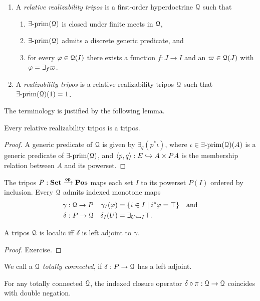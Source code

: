 \begin{definition} $ $
\begin{enumerate}
\item 
A \emph{relative realizability tripos} is a first-order hyperdoctrine ${\EuScript{Q}}$
such that 
\begin{enumerate}
\item $\exists\text{-}\mathrm{prim}({\EuScript{Q}})$ is closed under finite meets in ${\EuScript{Q}}$, 
\item $\exists\text{-}\mathrm{prim}({\EuScript{Q}})$ admits a discrete generic predicate, and 
\item for every $\varphi\in{\EuScript{Q}}(I)$ there exists a function $f:J\to
I$ and an \eprime $\varpi\in{\EuScript{Q}}(J)$ with $\varphi=\exists_f\varpi$.
\end{enumerate}
\item A \emph{realizability tripos} is a relative realizability tripos ${\EuScript{Q}}$
such that 
$\exists\text{-}\mathrm{prim}({\EuScript{Q}})(1)=1$.
\end{enumerate}
\end{definition}
The terminology is justified by the following lemma.
\begin{lemma}
Every relative realizability tripos is a tripos.
\end{lemma}
\begin{proof}
A generic predicate of ${\EuScript{Q}}$ is given by $\exists_q(p^* \iota)$, where 
$\iota\in\exists\text{-}\mathrm{prim}({\EuScript{Q}})(A)$ is a generic predicate of $\exists\text{-}\mathrm{prim}({\EuScript{Q}})$, and 
$\langle p,q\rangle:E\hookrightarrow A\times PA$ is the membership relation between 
$A$ and its powerset.
\end{proof}
The tripos $P:{\mathbf{Set}}\xrightarrow{\mathsf{op}}\mathbf{Pos}$ maps each set $I$ to its powerset $P(I)$ ordered by 
inclusion.
Every \foh ${\EuScript{Q}}$ admits \fmp indexed monotone maps
\begin{align}
\gamma&:{\EuScript{Q}}\to P &\gamma_I(\varphi)&=\{i\in I\mathrel| i^*\varphi=\top\}
\quad\text{and}\\
\delta&: P \to{\EuScript{Q}}& \delta_I(U)&= \exists_{U\hookrightarrow I}\top.
\end{align}
\begin{lemma}
A tripos ${\EuScript{Q}}$ is localic iff $\delta$ is left adjoint to $\gamma$.
\end{lemma}
\begin{proof}
Exercise.
\end{proof}
We call a \foh ${\EuScript{Q}}$ \emph{totally connected}, if $\delta:P\to{\EuScript{Q}}$ 
has a \fmp left adjoint.
\begin{lemma}
For any totally connected \foh ${\EuScript{Q}}$, the indexed closure operator
$\delta\circ\pi:{\EuScript{Q}}\to{\EuScript{Q}}$ coincides with double negation.
\end{lemma}
